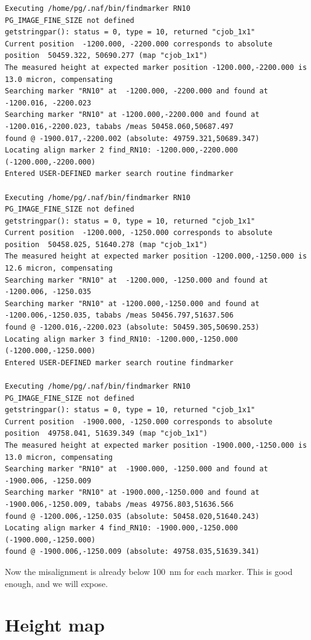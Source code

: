 \begin{itemize}
\begin{lstlisting}
Executing /home/pg/.naf/bin/findmarker RN10
PG_IMAGE_FINE_SIZE not defined
getstringpar(): status = 0, type = 10, returned "cjob_1x1"
Current position  -1200.000, -2200.000 corresponds to absolute position  50459.322, 50690.277 (map "cjob_1x1")
The measured height at expected marker position -1200.000,-2200.000 is 13.0 micron, compensating
Searching marker "RN10" at  -1200.000, -2200.000 and found at  -1200.016, -2200.023
Searching marker "RN10" at -1200.000,-2200.000 and found at -1200.016,-2200.023, tababs /meas 50458.060,50687.497
found @ -1900.017,-2200.002 (absolute: 49759.321,50689.347)
Locating align marker 2 find_RN10: -1200.000,-2200.000  (-1200.000,-2200.000)
Entered USER-DEFINED marker search routine findmarker

Executing /home/pg/.naf/bin/findmarker RN10
PG_IMAGE_FINE_SIZE not defined
getstringpar(): status = 0, type = 10, returned "cjob_1x1"
Current position  -1200.000, -1250.000 corresponds to absolute position  50458.025, 51640.278 (map "cjob_1x1")
The measured height at expected marker position -1200.000,-1250.000 is 12.6 micron, compensating
Searching marker "RN10" at  -1200.000, -1250.000 and found at  -1200.006, -1250.035
Searching marker "RN10" at -1200.000,-1250.000 and found at -1200.006,-1250.035, tababs /meas 50456.797,51637.506
found @ -1200.016,-2200.023 (absolute: 50459.305,50690.253)
Locating align marker 3 find_RN10: -1200.000,-1250.000  (-1200.000,-1250.000)
Entered USER-DEFINED marker search routine findmarker

Executing /home/pg/.naf/bin/findmarker RN10
PG_IMAGE_FINE_SIZE not defined
getstringpar(): status = 0, type = 10, returned "cjob_1x1"
Current position  -1900.000, -1250.000 corresponds to absolute position  49758.041, 51639.349 (map "cjob_1x1")
The measured height at expected marker position -1900.000,-1250.000 is 13.0 micron, compensating
Searching marker "RN10" at  -1900.000, -1250.000 and found at  -1900.006, -1250.009
Searching marker "RN10" at -1900.000,-1250.000 and found at -1900.006,-1250.009, tababs /meas 49756.803,51636.566
found @ -1200.006,-1250.035 (absolute: 50458.020,51640.243)
Locating align marker 4 find_RN10: -1900.000,-1250.000  (-1900.000,-1250.000)
found @ -1900.006,-1250.009 (absolute: 49758.035,51639.341)
\end{lstlisting}
\end{itemize}
Now the misalignment is already below \SI{100}{\nano\meter} for each marker. This is good enough, and we will expose.


\section{Height map}

